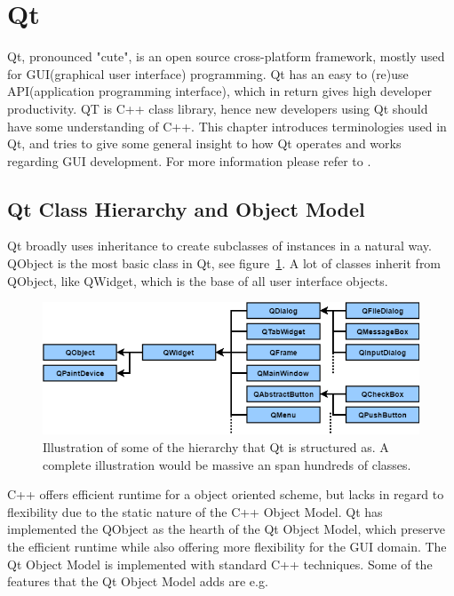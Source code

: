 \section{Qt}
Qt, pronounced "cute", is an open source cross-platform framework, mostly used for GUI(graphical user interface) programming. Qt has an easy to (re)use API(application programming interface), which in return gives high developer productivity. QT is C++ class library, hence new developers using Qt should have some understanding of C++.
This chapter introduces terminologies used in Qt, and tries to give some general insight to how Qt operates and works regarding GUI development. For more information please refer to \cite{QtDocumentation}.




\subsection{Qt Class Hierarchy and Object Model}
\label{sec:QtClassHierarchyAndObjectModel}
Qt broadly uses inheritance to create subclasses of instances in a natural way. QObject is the most basic class in Qt, see figure~\ref{fig:QtHeirachy}. A lot of classes inherit from QObject, like QWidget, which is the base of all user interface objects. 

\begin{figure}[h]
	\centering
	\includegraphics[scale=0.55]{Figures/QtHierachy.png}
	\caption{Illustration of some of the hierarchy that Qt is structured as. A complete illustration would be massive an span hundreds of classes.}
	\label{fig:QtHeirachy}
\end{figure}

C++ offers efficient runtime for a object oriented scheme, but lacks in regard to flexibility due to the static nature of the C++ Object Model. Qt has implemented the QObject as the hearth of the Qt Object Model, which preserve the efficient runtime while also offering more flexibility for the GUI domain. The Qt Object Model is implemented with standard C++ techniques. Some of the features that the Qt Object Model adds are e.g.

